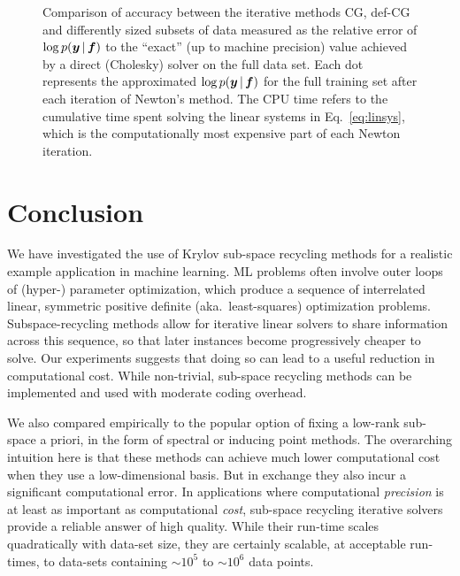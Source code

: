 \documentclass{article}
\newlength{\figheight}
\newlength{\figwidth}
\begin{document}
\setlength{\figwidth}{.99\textwidth}
\setlength{\figheight}{0.41803398875\figwidth}
\begin{figure}
    \centering \scriptsize
        
   \caption{\label{fig:convlin}Comparison of accuracy between the iterative methods CG, def-CG and differently sized subsets of data measured as the relative error of $\log p(\boldsymbol{y}\,|\, \boldsymbol{f})$ to the ``exact'' (up to machine precision) value achieved by a direct (Cholesky) solver on the full data set. Each dot represents the approximated $\log p(\boldsymbol{y}\,|\, \boldsymbol{f})$ for the full training set after each iteration of Newton's method. The CPU time refers to the cumulative time spent solving the linear systems in Eq.~\eqref{eq:linsys}, which is the computationally most expensive part of each Newton iteration.}
\end{figure}
\setlength{\figwidth}{.9\textwidth}




\section{Conclusion} 
\label{sec:conclusion}

We have investigated the use of Krylov sub-space recycling methods for a realistic example application in machine learning. ML problems often involve outer loops of (hyper-) parameter optimization, which produce a sequence of interrelated linear, symmetric positive definite (aka.~least-squares) optimization problems. Subspace-recycling methods allow for iterative linear solvers to share information across this sequence, so that later instances become progressively cheaper to solve. Our experiments suggests that doing so can lead to a useful reduction in computational cost. While non-trivial, sub-space recycling methods can be implemented and used with moderate coding overhead. 

We also compared empirically to the popular option of fixing a low-rank sub-space a priori, in the form of spectral or inducing point methods. The overarching intuition here is that these methods can achieve much lower computational cost when they use a low-dimensional basis. But in exchange they also incur a significant computational error. In applications where computational \emph{precision} is at least as important as computational \emph{cost}, sub-space recycling iterative solvers provide a reliable answer of high quality. While their run-time scales quadratically with data-set size, they are certainly scalable, at acceptable run-times, to data-sets containing $\sim 10^5$ to $\sim 10^6$ data points.

\small


\end{document}
